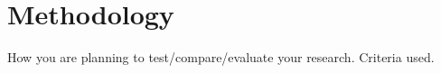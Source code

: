

    \chapter{Methodology}

    How you are planning to test/compare/evaluate your research.
    Criteria used.



